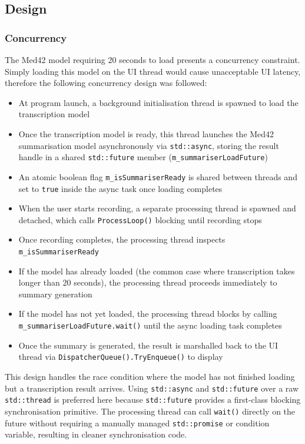 \subsection{Design}
\subsubsection{Concurrency}
The Med42 model requiring 20 seconds to load presents a concurrency constraint. Simply loading this model on the UI thread would cause unacceptable UI latency, therefore the following concurrency design was followed:

\begin{itemize}
    \item At program launch, a background initialisation thread is spawned to load the transcription model
    \item Once the transcription model is ready, this thread launches the Med42 summarisation model asynchronously via \texttt{std::async}, storing the result handle in a shared \texttt{std::future} member (\texttt{m\_summariserLoadFuture})
    \item An atomic boolean flag \texttt{m\_isSummariserReady} is shared between threads and set to \texttt{true} inside the async task once loading completes
    \item When the user starts recording, a separate processing thread is spawned and detached, which calls \texttt{ProcessLoop()} blocking until recording stops
    \item Once recording completes, the processing thread inspects \texttt{m\_isSummariserReady}
    \item If the model has already loaded (the common case where transcription takes longer than 20 seconds), the processing thread proceeds immediately to summary generation
    \item If the model has not yet loaded, the processing thread blocks by calling \texttt{m\_summariserLoadFuture.wait()} until the async loading task completes
    \item Once the summary is generated, the result is marshalled back to the UI thread via \texttt{DispatcherQueue().TryEnqueue()} to display
\end{itemize}

This design handles the race condition where the model has not finished loading but a transcription result arrives. Using \texttt{std::async} and \texttt{std::future} over a raw \texttt{std::thread} is preferred here because \texttt{std::future} provides a first-class blocking synchronisation primitive. The processing thread can call \texttt{wait()} directly on the future without requiring a manually managed \texttt{std::promise} or condition variable, resulting in cleaner synchronisation code.

